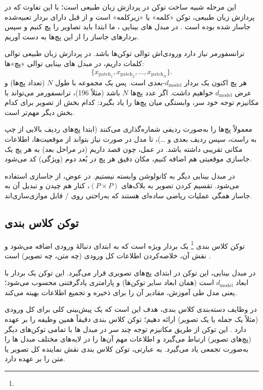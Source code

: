 این مرحله شبیه ساخت توکن در پردازش زبان طبیعی است؛ با این تفاوت که در پردازش زبان طبیعی، توکن «کلمه» یا «زیرکلمه» است و از قبل دارای بردار تعبیه‌شده جاساز شده بوده است \cite{vaswani2017attention}. در مبدل های بینایی \cite{dosovitskiy2020image}، ما ابتدا باید تصاویر را پچ کنیم و سپس بردارهای  جاساز را از این پچ‌ها به دست آوریم.

ترانسفورمر نیاز دارد ورودی‌اش توالی توکن‌ها باشد. در پردازش زبان طبیعی توالی کلمات داریم، در مبدل های بینایی توالی «پچ»‌ها:
\[
\{ x_{\text{patch}_1}, x_{\text{patch}_2}, \dots, x_{\text{patch}_N} \}.
\]
هر پچ اکنون یک بردار \(d_{\text{model}}\)-بعدی است. پس یک مجموعه با طول \(N\) (تعداد پچ‌ها) و عرض \(d_{\text{model}}\) خواهیم داشت.  
اگر عدد پچ‌ها \(N\) باشد (مثلاً 196)، ترانسفورمر می‌تواند با مکانیزم توجه خود سر، وابستگی  میان پچ‌ها را یاد بگیرد: کدام بخش از تصویر برای کدام بخش دیگر مهم‌تر است\cite{vaswani2017attention,dosovitskiy2020image}.

معمولاً پچ‌ها را به‌صورت ردیفی شماره‌گذاری می‌کنند (ابتدا پچ‌های ردیف بالایی از چپ به راست، سپس ردیف بعدی و …)، تا مدل در صورت نیاز بتواند از موقعیت‌ها، اطلاعات مکانی تقریبی داشته باشد.  
در عمل، چون قصد داریم (در مراحل بعد) به هر پچ یک جاسازی موقعیتی هم اضافه کنیم، مکان دقیق هر پچ در بُعد دوم (ویژگی) کد می‌شود.

در مبدل بینایی \cite{dosovitskiy2020image} دیگر به کانولوشن وابسته نیستیم. در عوض، از جاسازی استفاده می‌شود.  
تقسیم  کردن تصویر به بلاک‌های \((P \times P)\)، کنار هم چیدن و تبدیل آن به جاساز همگی عملیات ریاضی ساده‌ای هستند که به‌راحتی روی / قابل موازی‌سازی‌اند.

\subsection{توکن کلاس بندی}
توکن کلاس بندی \footnote{} یک بردار ویژه است که به ابتدای دنبالهٔ ورودی اضافه می‌شود و نقش آن، خلاصه‌کردن اطلاعات کل ورودی (چه متن، چه تصویر) است \cite{devlin2018bert,dosovitskiy2020image}.

در مبدل بینایی، این توکن در ابتدای پچ‌های تصویری قرار می‌گیرد.  
این توکن یک بردار با ابعاد \(d_{\text{model}}\) است (همان ابعاد سایر توکن‌ها) و پارامتری یادگرفتنی محسوب می‌شود؛ یعنی مدل طی آموزش، مقادیر آن را برای ذخیره و تجمیع اطلاعات بهینه می‌کند.

در وظایف دسته‌بندی کلاس بندی، هدف این است که یک پیش‌بینی کلی برای کل ورودی (مثلاً یک جمله یا یک تصویر) ارائه دهیم؛ توکن کلاس بندی دقیقاً همین وظیفه را بر عهده دارد \cite{devlin2018bert}. این توکن از طریق مکانیزم توجه چند سر در مبدل ها با تمامی توکن‌های دیگر (پچ‌های تصویر) ارتباط می‌گیرد و اطلاعات مهم آن‌ها را در لایه‌های مختلف مبدل ها را به‌صورت تجمعی یاد می‌گیرد. به عبارتی، توکن کلاس بندی نقش نماینده کل تصویر یا متن را بر عهده دارد.


